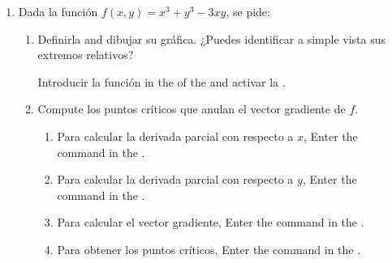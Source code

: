 \begin{enumerate}[leftmargin=*]
\item Dada la función $f(x,y)=x^3+y^3-3xy$, se pide:
      \begin{enumerate}
      \item Definirla and dibujar su gráfica. ¿Puedes identificar a simple vista sus extremos relativos?
            \begin{indication}
            Introducir la función  in the  of the   and activar la .
            \end{indication}

      \item Compute los puntos críticos que anulan el vector gradiente de $f$.
            \begin{indication}
            \begin{enumerate}
            \item Para calcular la derivada parcial con respecto a $x$, Enter the command  in the .
            \item Para calcular la derivada parcial con respecto a $y$, Enter the command  in the .
            \item Para calcular el vector gradiente, Enter the command  in the .
            \item Para obtener los puntos críticos, Enter the command  in the .
            \end{enumerate}
            \end{indication}


\end{enumerate}
\end{enumerate}
